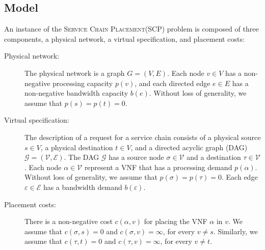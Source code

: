 \documentclass[11pt]{article}
\newcommand{\eps}{\varepsilon}
\newcommand{\scp}{\textsc{SCP}\xspace}
\newcommand{\scplong}{\textsc{Service Chain Placement}\xspace}
\newcommand{\calE}{\mathcal{E}}
\newcommand{\calG}{\mathcal{G}}
\newcommand{\calV}{\mathcal{V}}
\begin{document}
\subsection{Model}
%
An instance of the \scplong (\scp) problem is composed of three
components, a physical network, a virtual specification, and placement
costs:
\begin{description}
\item[Physical network:]
%
  The physical network is a graph $G = (V,E)$.  Each node $v \in V$
  has a non-negative processing capacity $p(v)$, and each directed
  edge $e \in E$ has a non-negative bandwidth capacity $b(e)$.
%
  Without loss of generality, we assume that $p(s) = p(t) = 0$.  

\medskip
  
\item[Virtual specification:]
%
  The description of a request for a service chain consists of a
  physical source $s \in V$, a physical destination $t \in V$, and a
  directed acyclic graph (DAG) $\calG = (\calV,\calE)$.
%
%
  The DAG $\calG$ has a source node $\sigma \in \calV$ and a
  destination $\tau \in \calV$. Each node $\alpha \in \calV$ represent
  a VNF that has a processing demand $p(\alpha)$.
%
  Without loss of generality, we assume that $p(\sigma) = p(\tau) =
  0$.  Each edge $\eps \in \calE$ has a bandwidth demand $b(\eps)$.

\medskip
  
\item[Placement costs:]
%
  There is a non-negative cost $c(\alpha,v)$ for placing the VNF
  $\alpha$ in $v$.  We assume that $c(\sigma,s) = 0$ and $c(\sigma,v)
  = \infty$, for every $v \neq s$.  Similarly, we assume that
  $c(\tau,t) = 0$ and $c(\tau,v) = \infty$, for every $v \neq t$.
\end{description}
\end{document}
